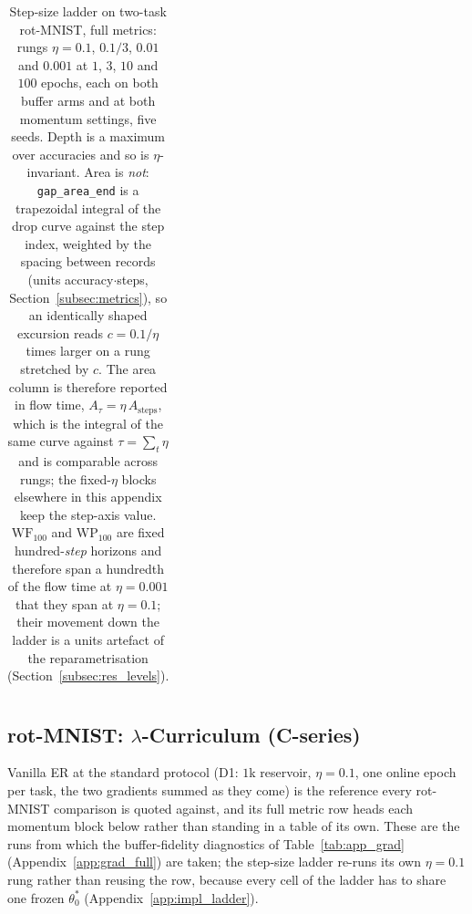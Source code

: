 \begin{table}[H]
{\begin{tabular}{l ccc cc c cc}
            \hline
        \end{tabular}%
    }
    \caption{Step-size ladder on two-task rot-MNIST, full metrics: rungs $\eta = 0.1$, $0.1/3$, $0.01$ and $0.001$ at $1$, $3$, $10$ and $100$ epochs, each on both buffer arms and at both momentum settings, five seeds. Depth is a maximum over accuracies and so is $\eta$-invariant. Area is \emph{not}: \texttt{gap\_area\_end} is a trapezoidal integral of the drop curve against the step index, weighted by the spacing between records (units accuracy${\cdot}$steps, Section~\ref{subsec:metrics}), so an identically shaped excursion reads $c = 0.1/\eta$ times larger on a rung stretched by $c$. The area column is therefore reported in flow time, $A_\tau = \eta\,A_{\text{steps}}$, which is the integral of the same curve against $\tau = \sum_t \eta$ and is comparable across rungs; the fixed-$\eta$ blocks elsewhere in this appendix keep the step-axis value. $\mathrm{WF}_{100}$ and $\mathrm{WP}_{100}$ are fixed hundred-\emph{step} horizons and therefore span a hundredth of the flow time at $\eta = 0.001$ that they span at $\eta = 0.1$; their movement down the ladder is a units artefact of the reparametrisation (Section~\ref{subsec:res_levels}).}
    \label{tab:app_ladder}
\end{table}


\subsection{rot-MNIST: \texorpdfstring{$\lambda$}{lambda}-Curriculum (C-series)}
\label{app:curr_full}

Vanilla ER at the standard protocol (D1: $1$k reservoir, $\eta = 0.1$, one online epoch per task, the two gradients summed as they come) is the reference every rot-MNIST comparison is quoted against, and its full metric row heads each momentum block below rather than standing in a table of its own. These are the runs from which the buffer-fidelity diagnostics of Table~\ref{tab:app_grad} (Appendix~\ref{app:grad_full}) are taken; the step-size ladder re-runs its own $\eta = 0.1$ rung rather than reusing the row, because every cell of the ladder has to share one frozen $\theta_0^*$ (Appendix~\ref{app:impl_ladder}).

